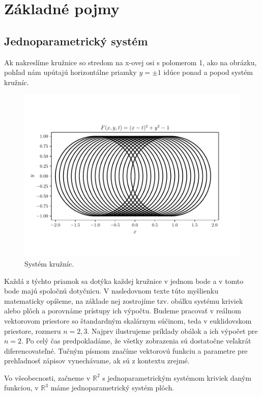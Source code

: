 \chapter{Základné pojmy}
\label{kap:kapitola1} %

\section{Jednoparametrický systém}
Ak nakreslíme kružnice so stredom na x-ovej osi s polomerom 1, ako na obrázku, pohľad nám upútajú horizontálne priamky $y = \pm 1$ idúce ponad a popod systém kružníc.

\begin{figure}[h]
	\centering
	\includegraphics{images/system.pdf}
	\caption{Systém kružníc.}
	\label{fig:system}
\end{figure}

Každá z týchto priamok sa dotýka každej kružnice v jednom bode a v tomto bode majú spoločnú dotyčnicu. V nasledovnom texte túto myšlienku matematicky opíšeme, na základe nej zostrojíme tzv. obálku systému kriviek alebo plôch a porovnáme prístupy ich výpočtu. Budeme pracovať v reálnom vektorovom priestore so štandardným skalárnym súčinom, teda v euklidovskom priestore, rozmeru $n = 2, 3.$ Najprv ilustrujeme príklady obálok a ich výpočet pre $ n = 2.$ Po celý čas predpokladáme, že všetky zobrazenia sú dostatočne veľakrát diferencovateľné. Tučným písmom značíme vektorovú funkciu a parametre pre prehľadnosť zápisov vynechávame, ak sú z kontextu zrejmé.

Vo všeobecnosti, začneme v $\mathbb{R}^2$ s jednoparametrickým systémom kriviek daným funkciou, v $\mathbb{R}^3$ máme jednoparametrický systém plôch.

